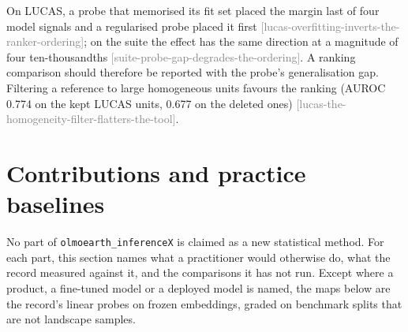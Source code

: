 \documentclass[11pt,a4paper]{article}
\newcommand{\claim}[1]{{\scriptsize\textsf{\textcolor{gray}{[#1]}}}}
\newcommand{\pkg}{\texttt{olmoearth\_inferenceX}}
\begin{document}
On LUCAS, a probe that memorised its fit set placed the margin last of four model signals and a regularised probe
placed it first \claim{lucas-overfitting-inverts-the-ranker-ordering}; on the suite the effect has the same direction at
a magnitude of four ten-thousandths \claim{suite-probe-gap-degrades-the-ordering}. A ranking comparison should therefore
be reported with the probe's generalisation gap. Filtering a reference to large homogeneous units favours the ranking
(AUROC 0.774 on the kept LUCAS units, 0.677 on the deleted ones) \claim{lucas-the-homogeneity-filter-flatters-the-tool}.

\section{Contributions and practice baselines}
\label{sec:contrib}

No part of \pkg{} is claimed as a new statistical method. For each part, this section names what a practitioner would
otherwise do, what the record measured against it, and the comparisons it has not run. Except where a product, a
fine-tuned model or a deployed model is named, the maps below are the record's linear probes on frozen embeddings,
graded on benchmark splits that are not landscape samples.
\end{document}
